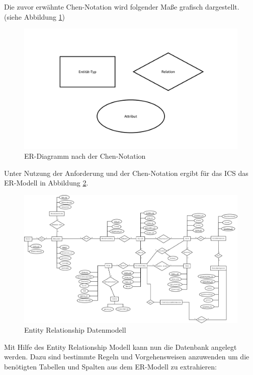 		Die zuvor erwähnte Chen-Notation wird folgender Maße grafisch dargestellt. (siehe Abbildung \ref{fig:chennotation})
		\begin{figure}[H]
			\centering 
			\includegraphics[scale=0.3]{img/ChenNotationERDiagramm.pdf}
			\captionsetup{format=hang}
			\caption[Klassendiagramm]{\label{fig:chennotation} ER-Diagramm nach der Chen-Notation }
		\end{figure}
		
		Unter Nutzung der Anforderung und der Chen-Notation ergibt für das \ac{ICS} das ER-Modell in Abbildung \ref{fig:erModell}.
		
		\begin{figure}[H]
			\centering 
			\includegraphics[angle=-90,width=13cm]{img/erModell.png}
			\captionsetup{format=hang}
			\caption[Entity Relationship Datenmodell]{\label{fig:erModell} Entity Relationship Datenmodell}
		\end{figure}
		
		Mit Hilfe des Entity Relationship Modell kann nun die Datenbank angelegt werden. Dazu sind bestimmte Regeln und Vorgehensweisen anzuwenden um die benötigten Tabellen und Spalten aus dem ER-Modell zu extrahieren:
		
